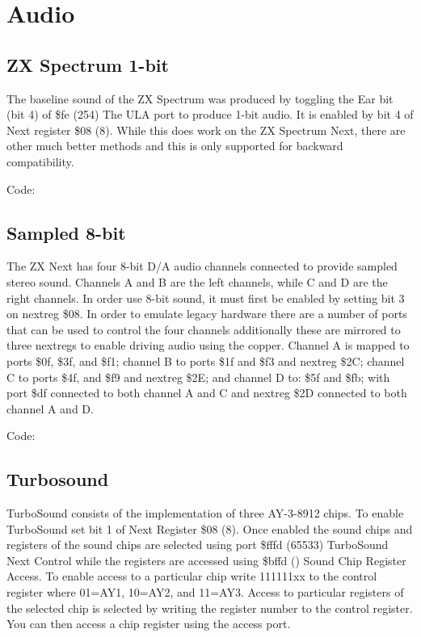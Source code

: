 \chapter{Audio}
\section{ZX Spectrum 1-bit}

The baseline sound of the ZX Spectrum was produced by toggling the Ear
bit (bit 4) of \$fe (254) The ULA port to produce 1-bit audio.  It is
enabled by bit 4 of Next register \$08 (8).  While this does work on
the ZX Spectrum Next, there are other much better methods and this is
only supported for backward compatibility.

Code:


\section{Sampled 8-bit}

The ZX Next has four 8-bit D/A audio channels connected to provide
sampled stereo sound. Channels A and B are the left channels, while C
and D are the right channels. In order use 8-bit sound, it must first
be enabled by setting bit 3 on nextreg \$08. In order to emulate
legacy hardware there are a number of ports that can be used to
control the four channels additionally these are mirrored to three
nextregs to enable driving audio using the copper.  Channel A is
mapped to ports \$0f, \$3f, and \$f1; channel B to ports \$1f and \$f3
and nextreg \$2C; channel C to ports \$4f, and \$f9 and nextreg \$2E;
and channel D to: \$5f and \$fb; with port \$df connected to both
channel A and C and nextreg \$2D connected to both channel A and D.

Code:


\section{Turbosound}

TurboSound consists of the implementation of three AY-3-8912 chips. To
enable TurboSound set bit 1 of Next Register \$08 (8). Once enabled
the sound chips and registers of the sound chips are selected using
port \$fffd (65533) TurboSound Next Control while the registers are
accessed using \$bffd () Sound Chip Register Access.  To enable access
to a particular chip write 111111xx to the control register where
01=AY1, 10=AY2, and 11=AY3.  Access to particular registers of the
selected chip is selected by writing the register number to the
control register. You can then access a chip register using the access
port.

